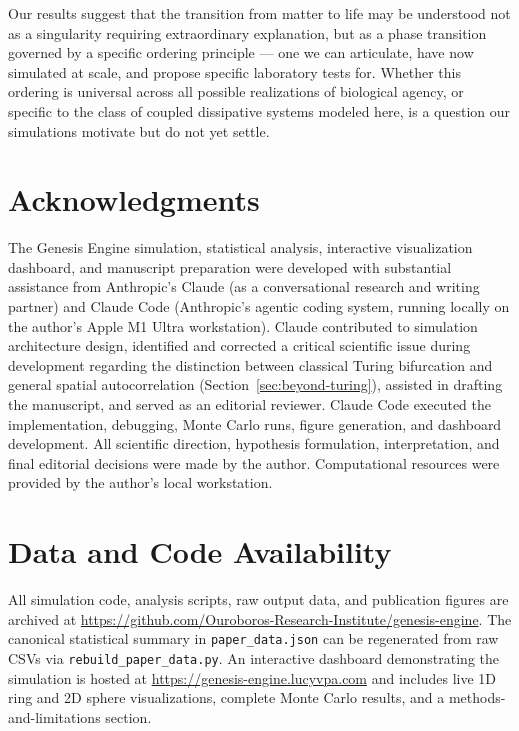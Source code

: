 \documentclass[11pt,letterpaper]{article}
\begin{document}
Our results suggest that the transition from matter to life may be understood not as a singularity requiring extraordinary explanation, but as a phase transition governed by a specific ordering principle --- one we can articulate, have now simulated at scale, and propose specific laboratory tests for. Whether this ordering is universal across all possible realizations of biological agency, or specific to the class of coupled dissipative systems modeled here, is a question our simulations motivate but do not yet settle.

\section*{Acknowledgments}

The Genesis Engine simulation, statistical analysis, interactive visualization dashboard, and manuscript preparation were developed with substantial assistance from Anthropic's Claude (as a conversational research and writing partner) and Claude Code (Anthropic's agentic coding system, running locally on the author's Apple M1 Ultra workstation). Claude contributed to simulation architecture design, identified and corrected a critical scientific issue during development regarding the distinction between classical Turing bifurcation and general spatial autocorrelation (Section~\ref{sec:beyond-turing}), assisted in drafting the manuscript, and served as an editorial reviewer. Claude Code executed the implementation, debugging, Monte Carlo runs, figure generation, and dashboard development. All scientific direction, hypothesis formulation, interpretation, and final editorial decisions were made by the author. Computational resources were provided by the author's local workstation.

\section*{Data and Code Availability}

All simulation code, analysis scripts, raw output data, and publication figures are archived at \url{https://github.com/Ouroboros-Research-Institute/genesis-engine}. The canonical statistical summary in \texttt{paper\_data.json} can be regenerated from raw CSVs via \texttt{rebuild\_paper\_data.py}. An interactive dashboard demonstrating the simulation is hosted at \url{https://genesis-engine.lucyvpa.com} and includes live 1D ring and 2D sphere visualizations, complete Monte Carlo results, and a methods-and-limitations section.
\end{document}
